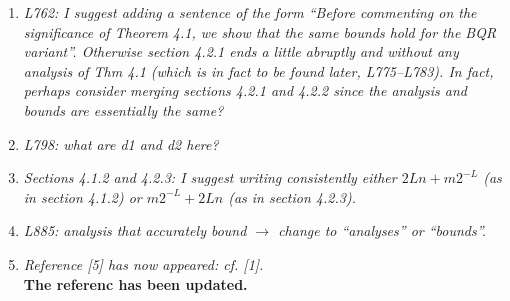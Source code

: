 \documentclass[final,onefignum,onetabnum]{siamart190516}
\begin{document}
\begin{enumerate}
    \item {\it L762: I suggest adding a sentence of the form “Before commenting on the significance of Theorem 4.1, we show that the same bounds hold for the BQR variant”. Otherwise section 4.2.1 ends a little abruptly and without any analysis of Thm 4.1 (which is in fact to be found later, L775–L783). In fact, perhaps consider merging sections 4.2.1 and 4.2.2 since the analysis and bounds are essentially the same?}
    \item {\it L798: what are d1 and d2 here?}
    \item {\it Sections 4.1.2 and 4.2.3: I suggest writing consistently either $2Ln + m2^{-L}$ (as in
section 4.1.2) or $m2^{-L} + 2Ln$ (as in section 4.2.3).}
    \item {\it L885: analysis that accurately bound $\rightarrow$ change to ``analyses'' or ``bounds''.}
    \item {\it Reference [5] has now appeared: cf. [1].} \\
    {\bf The referenc has been updated.}
\end{enumerate}


\end{document}
